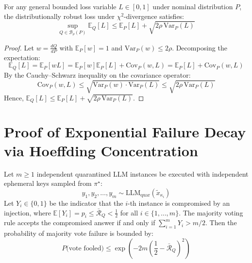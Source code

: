 \begin{corollary}
For any general bounded loss variable $L \in [0, 1]$ under nominal distribution $P$, the distributionally robust loss under $\chi^2$-divergence satisfies:
\begin{equation}
    \sup_{Q \in \mathcal{B}_\rho(P)} \mathbb{E}_Q[L] \le \mathbb{E}_P[L] + \sqrt{2\rho\,\mathrm{Var}_P(L)}
\end{equation}
\end{corollary}

\begin{proof}
Let $w = \frac{dQ}{dP}$ with $\mathbb{E}_P[w] = 1$ and $\mathrm{Var}_P(w) \le 2\rho$. Decomposing the expectation:
\begin{equation}
    \mathbb{E}_Q[L] = \mathbb{E}_P[w L] = \mathbb{E}_P[w]\mathbb{E}_P[L] + \mathrm{Cov}_P(w, L) = \mathbb{E}_P[L] + \mathrm{Cov}_P(w, L)
\end{equation}
By the Cauchy--Schwarz inequality on the covariance operator:
\begin{equation}
    \mathrm{Cov}_P(w, L) \le \sqrt{\mathrm{Var}_P(w) \cdot \mathrm{Var}_P(L)} \le \sqrt{2\rho\,\mathrm{Var}_P(L)}
\end{equation}
Hence, $\mathbb{E}_Q[L] \le \mathbb{E}_P[L] + \sqrt{2\rho\,\mathrm{Var}_P(L)}$.
\end{proof}

\section{Proof of Exponential Failure Decay via Hoeffding Concentration}
\label{app:proof_hoeffding}

\begin{theorem}
Let $m \ge 1$ independent quarantined LLM instances be executed with independent ephemeral keys sampled from $\pi^\star$:
\begin{equation}
    y_1, y_2, \dots, y_m \sim \mathrm{LLM}_{\mathrm{quar}}(\tilde{x}_{\kappa_i})
\end{equation}
Let $Y_i \in \{0, 1\}$ be the indicator that the $i$-th instance is compromised by an injection, where $\mathbb{E}[Y_i] = p_i \le \bar{\mathcal{R}}_Q < \frac{1}{2}$ for all $i \in \{1, \dots, m\}$. The majority voting rule accepts the compromised answer if and only if $\sum_{i=1}^m Y_i > m/2$. Then the probability of majority vote failure is bounded by:
\begin{equation}
    P\big(\text{vote fooled}\big) \le \exp\left( -2 m \left(\frac{1}{2} - \bar{\mathcal{R}}_Q\right)^{\!2} \right)
\end{equation}
\end{theorem}

